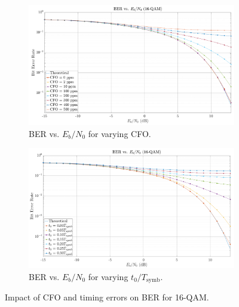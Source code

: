 \documentclass[11pt]{article}
\begin{document}
	\begin{figure}[H]
		\centering
		\begin{subfigure}[b]{0.48\textwidth}
			\centering
			\includegraphics[width=\linewidth]{Images/ber-cfo}
			\caption{BER vs. $E_b/N_0$ for varying CFO.}
			\label{fig:ber-cfo_compact}
		\end{subfigure}
		\hfill
		\begin{subfigure}[b]{0.48\textwidth}
			\centering
			\includegraphics[width=\linewidth]{Images/ber-timing}
			\caption{BER vs. $E_b/N_0$ for varying $t_0/T_{\text{symb}}$.}
			\label{fig:ber-timing_compact}
		\end{subfigure}
		\caption{Impact of CFO and timing errors on BER for 16-QAM.}
		\label{fig:ber_sync_errors}
	\end{figure}
			
\end{document}
